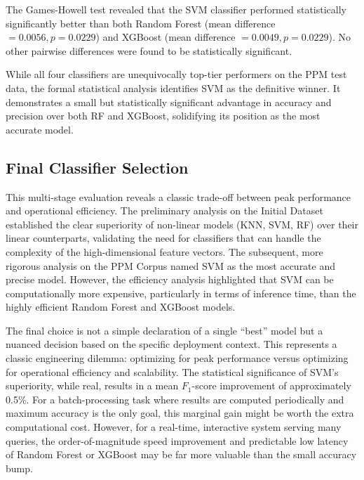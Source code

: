 The Games-Howell test revealed that the SVM classifier performed statistically significantly better than both Random Forest (mean difference \(= 0.0056, p=0.0229\)) and XGBoost (mean difference \(= 0.0049, p=0.0229\)). No other pairwise differences were found to be statistically significant.  

While all four classifiers are unequivocally top-tier performers on the PPM test data, the formal statistical analysis identifies SVM as the definitive winner. It demonstrates a small but statistically significant advantage in accuracy and precision over both RF and XGBoost, solidifying its position as the most accurate model.

\subsection{Final Classifier Selection}
This multi-stage evaluation reveals a classic trade-off between peak performance and operational efficiency. The preliminary analysis on the Initial Dataset established the clear superiority of non-linear models (KNN, SVM, RF) over their linear counterparts, validating the need for classifiers that can handle the complexity of the high-dimensional feature vectors. The subsequent, more rigorous analysis on the PPM Corpus named SVM as the most accurate and precise model. However, the efficiency analysis highlighted that SVM can be computationally more expensive, particularly in terms of inference time, than the highly efficient Random Forest and XGBoost models.

The final choice is not a simple declaration of a single ``best'' model but a nuanced decision based on the specific deployment context. This represents a classic engineering dilemma: optimizing for peak performance versus optimizing for operational efficiency and scalability. The statistical significance of SVM's superiority, while real, results in a mean \(F_1\)-score improvement of approximately 0.5\%. For a batch-processing task where results are computed periodically and maximum accuracy is the only goal, this marginal gain might be worth the extra computational cost. However, for a real-time, interactive system serving many queries, the order-of-magnitude speed improvement and predictable low latency of Random Forest or XGBoost may be far more valuable than the small accuracy bump.

